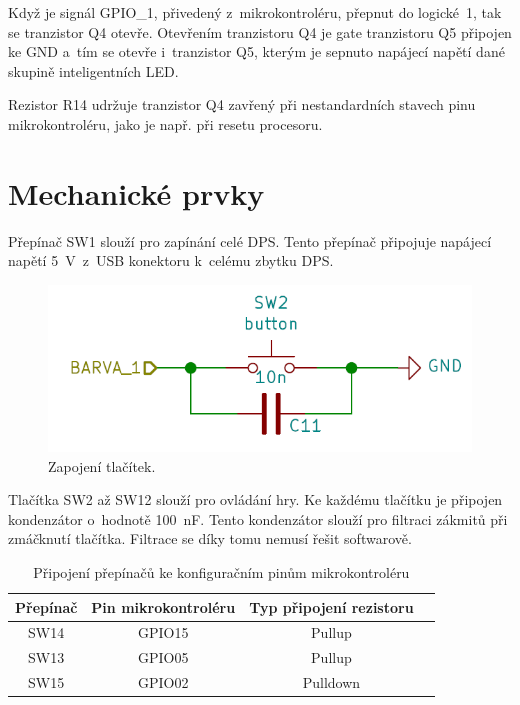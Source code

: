   Když je signál GPIO\_1, přivedený z~mikrokontroléru, přepnut do logické~1, tak se tranzistor Q4 otevře. Otevřením tranzistoru Q4 je gate tranzistoru Q5 
  připojen ke GND a~tím se otevře i~tranzistor Q5, kterým je sepnuto napájecí napětí dané skupině inteligentních LED.

  Rezistor R14 udržuje tranzistor Q4 zavřený při nestandardních stavech pinu mikrokontroléru, jako je např. při resetu procesoru.

  \section{Mechanické prvky}
  Přepínač SW1 slouží pro zapínání celé DPS. Tento přepínač připojuje napájecí napětí 5~V~z~USB konektoru k~celému zbytku DPS. 

  \begin{figure}[!h]
    \begin{center}
      \includegraphics[scale=0.5]{obrazky/Tlacitka_zapojeni.png}
    \end{center}
    \caption[Zapojení tlačítek]{Zapojení tlačítek.}
  \end{figure}

  Tlačítka SW2 až SW12 slouží pro ovládání hry. Ke každému tlačítku je připojen kondenzátor o~hodnotě 100~nF. Tento kondenzátor 
  slouží pro filtraci zákmitů při zmáčknutí tlačítka. Filtrace se díky tomu nemusí řešit softwarově.

  \begin{table}[!h]
    \caption{Připojení přepínačů ke konfiguračním pinům mikrokontroléru}
    \begin{center}
        \begin{tabular}{|c|c|c|c|}
            \hline
            \rowcolor[HTML]{C0C0C0} 
            Přepínač   & Pin mikrokontroléru & Typ připojení rezistoru \\
            \hline
            SW14      & GPIO15 & Pullup \\
            \hline
            SW13      & GPIO05 & Pullup \\
            \hline
            SW15      & GPIO02 & Pulldown \\
            \hline
        \end{tabular}    
    \end{center}
  \end{table}

